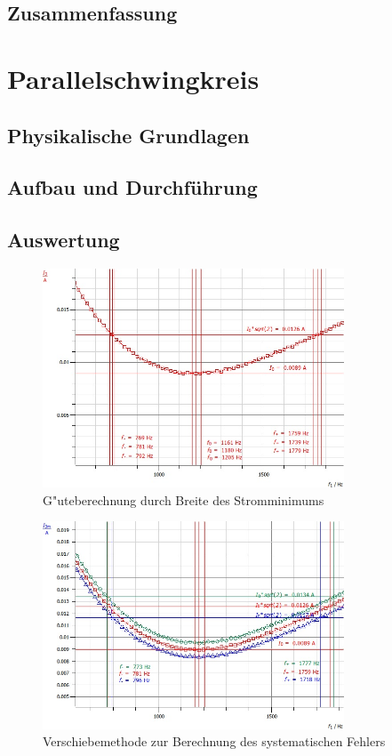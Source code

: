 \documentclass[12pt,a4paper]{article}
\begin{document}
\subsection{Zusammenfassung}

\newpage
\section{Parallelschwingkreis}
\subsection{Physikalische Grundlagen}
\subsection{Aufbau und Durchführung}
\subsection{Auswertung}

\begin{figure}[H]
	\centering
	\includegraphics[width=0.8\textwidth]{Daten/P47Ohm_f0.jpg}
	\caption{G"uteberechnung durch Breite des Stromminimums}
	\label{P47Ohm_f0}
\end{figure}

\begin{figure}[H]
	\centering
	\includegraphics[width=0.8\textwidth]{Daten/P47Ohm_f0_sys.jpg}
	\caption{Verschiebemethode zur Berechnung des systematischen Fehlers}
	\label{P47Ohm_f0_sys}
\end{figure}
\end{document}
